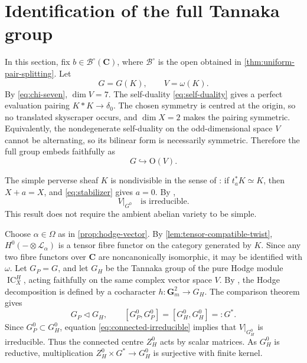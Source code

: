 \documentclass[10pt]{amsart}
\numberwithin{equation}{section}
\theoremstyle{definition}
\theoremstyle{remark}
\newcommand{\CC}{\mathbf C}
\newcommand{\GGm}{\mathbf G_m}
\newcommand{\IC}{\operatorname{IC}}
\newcommand{\cB}{\mathcal B}
\begin{document}
\section{Identification of the full Tannaka group}

In this section, fix $b\in\cB^\circ(\CC)$, where $\cB^\circ$ is the open
obtained in \cref{thm:uniform-pair-splitting}.
Let
\[
 G=G(K),\qquad V=\omega(K).
\]
By \eqref{eq:chi-seven}, $\dim V=7$.  The self-duality
\eqref{eq:self-duality} gives a perfect evaluation pairing
$K*K\to\delta_0$.  The chosen symmetry
is centred at the origin, so no translated skyscraper occurs, and
$\dim X=2$ makes the pairing symmetric.  Equivalently, the nondegenerate
self-duality on the odd-dimensional space $V$ cannot be alternating, so its
bilinear form is necessarily symmetric.  Therefore the full group embeds
faithfully as
\begin{equation}
 G\hookrightarrow \mathrm{O}(V).
\label{eq:orthogonal}
\end{equation}

The simple perverse sheaf $K$ is nondivisible in the sense of
\cite[Section~3.3]{JKLM2025}: if $t_a^*K\simeq K$, then $X+a=X$, and
\eqref{eq:stabilizer} gives $a=0$.  By
\cite[Proposition~3.3(2)]{JKLM2025},
\begin{equation}
 V|_{G^0}\quad\text{is irreducible}.
\label{eq:connected-irreducible}
\end{equation}
This result does not require the ambient abelian variety to be simple.

Choose $\alpha\in\Omega$ as in \cref{prop:hodge-vector}.  By
\cref{lem:tensor-compatible-twist}, $H^0(-\otimes\mathcal L_\alpha)$ is a
tensor fibre functor on the category generated by $K$.  Since any two fibre
functors over $\CC$ are noncanonically isomorphic, it may be identified
with $\omega$.  Let $G_P=G$, and let
$G_H$ be the Tannaka group of the pure Hodge module $\IC_X^H$, acting
faithfully on the same complex vector space $V$.
By \cite[Corollary~3.2]{KLM2026}, the Hodge decomposition is defined by a
cocharacter $h:\GGm^2\to G_H$.  The comparison theorem
\cite[Corollary~2.5]{KLM2026} gives
\[
 G_P\mathrel{\triangleleft}G_H,
 \qquad
 [G_P^0,G_P^0]=[G_H^0,G_H^0]=:G^*.
\]
Since $G_P^0\subset G_H^0$, equation
\eqref{eq:connected-irreducible} implies that $V|_{G_H^0}$ is irreducible.
Thus the connected centre $Z_H^0$ acts by scalar matrices.  As $G_H^0$ is
reductive, multiplication $Z_H^0\times G^*\to G_H^0$ is surjective with
finite kernel.
\end{document}
